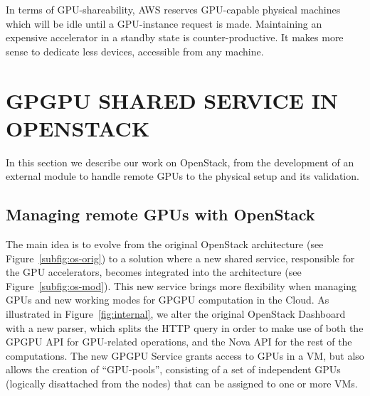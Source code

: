 \documentclass[a4paper,twoside]{article}
\begin{document}
In terms of GPU-shareability, AWS reserves GPU-capable physical machines which will be idle until a GPU-instance request is made.
Maintaining an expensive accelerator in a standby state is counter-productive. 
It makes more sense to dedicate less devices, accessible from any machine.

\section{\uppercase{GPGPU Shared Service in OpenStack}}
\label{sec:gpgpuOS}
In this section we describe our work on OpenStack, from the development of an external module to handle remote GPUs to the physical setup and its validation.

\subsection{Managing remote GPUs with OpenStack}
The main idea is to evolve from the original OpenStack architecture (see Figure~\ref{subfig:os-orig})
 to a solution where a new shared service, responsible for the GPU accelerators, becomes integrated into the architecture (see Figure~\ref{subfig:os-mod}).
This new service brings more flexibility when managing GPUs and new working modes for GPGPU computation in the Cloud.
As illustrated in Figure~\ref{fig:internal}, we alter the original OpenStack Dashboard with a new parser, 
which splits the HTTP query in order to make use of both the GPGPU API for GPU-related operations, and the Nova API for the rest of the computations. 
The new GPGPU Service grants access to GPUs in a VM, but also allows the creation of ``GPU-pools'', consisting of a set of independent GPUs (logically disattached from the nodes) that can be assigned to one or more VMs.
\end{document}

